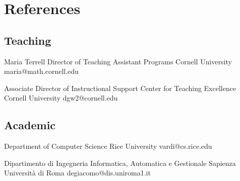 \documentclass[10pt,a4paper,sans]{moderncv}
\newif\ifref
\begin{document}


\ifref
\newpage
\section{References}

\subsection{Teaching}

\cventry{}
{Maria Terrell}
{Director of Teaching Assistant Programs}
{Cornell University}
{}
{maria@math.cornell.edu}


{Associate Director of Instructional Support}
{Center for Teaching Excellence}
{Cornell University}
{dgw2@cornell.edu}

% 
% 

\subsection{Academic}


{Department of Computer Science}
{Rice University}
{}
{vardi@cs.rice.edu}

{Dipartimento di Ingegneria Informatica, Automatica e Gestionale} 
{Sapienza Universit\`a di Roma}
{}
{degiacomo@dis.uniroma1.it}
\end{document}
